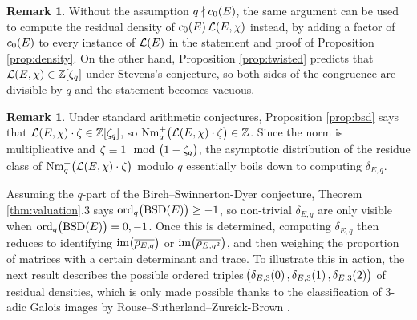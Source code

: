 \documentclass{article}
\theoremstyle{plain}
\theoremstyle{definition}
\newtheorem{remark}[n]{Remark}
\newcommand{\BSD}{\operatorname{BSD}}
\newcommand{\im}{\operatorname{im}}
\newcommand{\LLL}{\mathcal{L}}
\newcommand{\Nm}{\operatorname{Nm}}
\newcommand{\ord}{\operatorname{ord}}
\newcommand{\ZZ}{\mathbb{Z}}
\newcommand{\br}{\!\del}
\begin{document}
\begin{remark}
Without the assumption $ q \nmid c_0\br{E} $, the same argument can be used to compute the residual density of $ c_0\br{E}\LLL\br{E, \chi} $ instead, by adding a factor of $ c_0\br{E} $ to every instance of $ \LLL\br{E} $ in the statement and proof of Proposition \ref{prop:density}. On the other hand, Proposition \ref{prop:twisted} predicts that $ \LLL\br{E, \chi} \in \ZZ\sbr[0]{\zeta_q} $ under Stevens's conjecture, so both sides of the congruence are divisible by $ q $ and the statement becomes vacuous.
\end{remark}

\pagebreak

\begin{remark}
Under standard arithmetic conjectures, Proposition \ref{prop:bsd} says that $ \LLL\br{E, \chi} \cdot \zeta \in \ZZ\sbr[0]{\zeta_q} $, so $ \Nm_q^+\br{\LLL\br{E, \chi} \cdot \zeta} \in \ZZ $. Since the norm is multiplicative and $ \zeta \equiv 1 \mod \br{1 - \zeta_q} $, the asymptotic distribution of the residue class of $ \Nm_q^+\br{\LLL\br{E, \chi} \cdot \zeta} $ modulo $ q $ essentially boils down to computing $ \delta_{E, q} $.
\end{remark}

Assuming the $ q $-part of the Birch--Swinnerton-Dyer conjecture, Theorem \ref{thm:valuation}.3 says $ \ord_q\br{\BSD\br{E}} \ge -1 $, so non-trivial $ \delta_{E, q} $ are only visible when $ \ord_q\br{\BSD\br{E}} = 0, -1 $. Once this is determined, computing $ \delta_{E, q} $ then reduces to identifying $ \im\br{\overline{\rho_{E, q}}} $ or $ \im\br{\overline{\rho_{E, q^2}}} $, and then weighing the proportion of matrices with a certain determinant and trace. To illustrate this in action, the next result describes the possible ordered triples $ \br{\delta_{E, 3}\br{0}, \delta_{E, 3}\br{1}, \delta_{E, 3}\br{2}} $ of residual densities, which is only made possible thanks to the classification of $ 3 $-adic Galois images by Rouse--Sutherland--Zureick-Brown \cite[Corollary 1.3.1 and Corollary 12.3.3]{RSZB22}.
\end{document}

